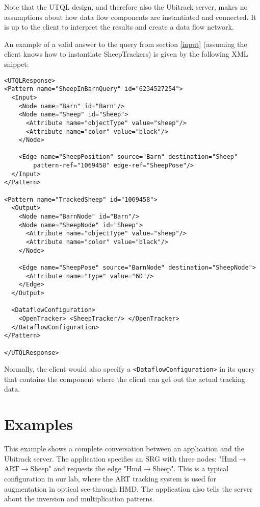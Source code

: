 \documentclass[11pt]{article}
\begin{document}
Note that the UTQL design, and therefore
also the Ubitrack server, makes no assumptions about how data flow components
are instantiated and connected. It is up to the client to interpret the results
and create a data flow network.

An example of a valid answer to the query
from section \ref{input} (assuming the client knows how to instantiate SheepTrackers)
is given by the following XML snippet:

\begin{Verbatim}[fontsize=\footnotesize,tabsize=2] 
<UTQLResponse>
<Pattern name="SheepInBarnQuery" id="6234527254">
  <Input>
    <Node name="Barn" id="Barn"/>
    <Node name="Sheep" id="Sheep">
      <Attribute name="objectType" value="sheep"/>
      <Attribute name="color" value="black"/>
    </Node>

    <Edge name="SheepPosition" source="Barn" destination="Sheep" 
    	pattern-ref="1069458" edge-ref="SheepPose"/>
  </Input>
</Pattern>

<Pattern name="TrackedSheep" id="1069458">
  <Output>
    <Node name="BarnNode" id="Barn"/>
    <Node name="SheepNode" id="Sheep">
      <Attribute name="objectType" value="sheep"/>
      <Attribute name="color" value="black"/>
    </Node>

    <Edge name="SheepPose" source="BarnNode" destination="SheepNode">
      <Attribute name="type" value="6D"/>
    </Edge>
  </Output>
  
  <DataflowConfiguration>
    <OpenTracker> <SheepTracker/> </OpenTracker>
  </DataflowConfiguration>
</Pattern>

</UTQLResponse>
\end{Verbatim} 

Normally, the client would also specify a \texttt{<DataflowConfiguration>}
in its query that contains the component where the client can get
out the actual tracking data.

\section{Examples}

This example shows a complete conversation
between an application and the Ubitrack server. The application specifies an
SRG with three nodes: "Hmd$\rightarrow$ART$\rightarrow$Sheep" and requests the edge "Hmd$\rightarrow$Sheep". 
This is a typical configuration in our lab, where the
ART tracking system is used for augmentation in optical see-through HMD. The
application also tells the server about the inversion and multiplication
patterns.
\end{document}
